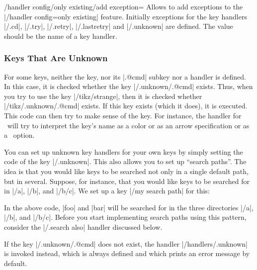 \begin{key}{/handler config/only existing/add exception=}
    Allows to add exceptions to the |/handler config=only existing| feature.
    Initially exceptions for the key handlers |/.cd|, |/.try|, |/.retry|,
    |/.lastretry| and |/.unknown| are defined. The value  should be the name of a key handler.
\end{key}


\subsubsection{Keys That Are Unknown}
\label{sec:pgf:unknown:keys}

For some keys, neither the key, nor its |.@cmd| subkey nor a handler is
defined. In this case, it is checked whether the key |/.unknown/.@cmd| exists. Thus, when you try to use the key
|/tikz/strange|, then it is checked whether |/tikz/.unknown/.@cmd| exists. If
this key exists (which it does), it is executed. This code can then try to make
sense of the key. For instance, the handler for \tikzname\ will try to
interpret the key's name as a color or as an arrow specification or as a
\pgfname\ option.

You can set up unknown key handlers for your own keys by simply setting the
code of the key |/.unknown|. This also allows you to set
up ``search paths''. The idea is that you would like keys to be searched not
only in a single default path, but in several. Suppose, for instance, that you
would like keys to be searched for in |/a|, |/b|, and |/b/c|. We set up a key
|/my search path| for this:
%
\begin{codeexample}
\end{codeexample}
%
In the above code, |foo| and |bar| will be searched for in the three
directories  |/a|, |/b|, and |/b/c|. Before you start implementing search paths
using this pattern, consider the |/.search also| handler discussed below.

If the key |/.unknown/.@cmd| does not exist, the handler
|/handlers/.unknown| is invoked instead, which is always defined and which
prints an error message by default.


